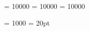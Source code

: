 \newcommand{\listofpseudocodename}{Pseudocodeverzeichnis}
\newcommand{\listofpseudocode}{\listof{pseudocode}{\listofpseudocodename}}
\providecommand*{\pseudocodeautorefname}{Pseudocode}

\textwidth14cm
\topmargin-1.2cm
\renewcommand{\baselinestretch}{1.4} 

\clubpenalty = 10000
\widowpenalty = 10000
\displaywidowpenalty = 10000

\tolerance = 1000
\emergencystretch = 20pt